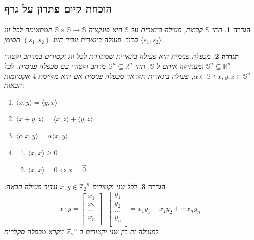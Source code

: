 \documentclass[12pt,leqno]{article}
\theoremstyle{theoremdd}
\newtheorem{definition}{הגדרה}
\newcommand{\Zn}{{\mathbb{Z}_2}^n}
\begin{document}
\subsection{הוכחת קיום פתרון על גרף}
\begin{definition}
    תהי 
    $\mathbb{S}$
    קבוצה,
    פעולה בינארית על 
    $\mathbb{S}$
    היא פונקציה
    $\mathbb{S} \times \mathbb{S} \rightarrow \mathbb{S}$
    המתאימה לכל זוג 
    סדור.
    פעולה בינארית 
    עבור הזוג
    $(s_1, s_2)$
    תסומן
    $\langle s_1, s_2 \rangle$.
\end{definition}
\begin{definition}
    מכפלה פנימית 
    היא פעולה
    בינארית
    שמוגדרת לכל זוג וקטורים 
    במרחב וקטורי 
    $\mathbb{S}^n \subseteq \mathbb{R}^n$
    ומעתיקה אותם 
    ל
    $\mathbb{S}$.
    תהי 
    $\mathbb{S}^n \subseteq \mathbb{R}^n$
    מרחב וקטורי עם מכפלה פנימית,
    לכל
    $x,y,z \in \mathbb{S}^n$
    ו
    $\alpha \in \mathbb{S}$,
    פעולה בינארית תקראה מכפלה פנימית אם היא מקיימת
    $4$
    אקסיומות
    הבאות:
    \begin{enumerate}
        \item 
        $\langle x, y \rangle = \langle y,x \rangle$
        \item 
        $\langle x + y, z \rangle = \langle x, z \rangle + \langle y, z \rangle$
        \item 
        $\langle \alpha \ x, y \rangle = \alpha \langle x, y \rangle$
        \item 
        \begin{enumerate}
            \item 
            $\langle x, x \rangle \ge 0$ 
            \item 
            $\langle x, x \rangle = 0 \Longleftrightarrow  x = \vec{0}$ 
        \end{enumerate}
    \end{enumerate}
\end{definition}
\begin{definition}
    \label{def:inner_mul}
    לכל שני וקטורים
    $x, y \in \Zn$
    נגדיר פעולה הבאה:
    \begin{equation}
        x \cdot y = 
        \begin{bmatrix}
            x_1 \\
            x_2 \\
            \cdots \\
            x_n \\
        \end{bmatrix}
        \cdot 
        \begin{bmatrix}
            y_1 \\
            y_2 \\
            \cdots \\
            y_n \\
        \end{bmatrix}
        = 
        x_1 y_1 + x_2 y_2 + \cdots x_n y_n
    \end{equation}
    לפעולה זה
    בין שני וקטורים ב
    $\Zn$
    ניקרא מכפלה סקלרית. 
\end{definition}
\end{document}
